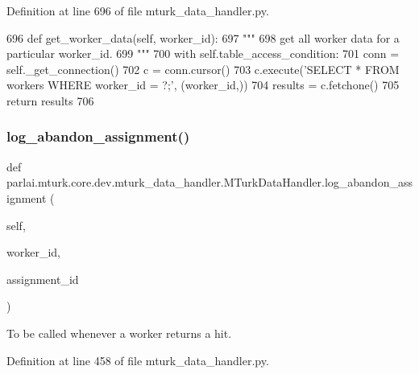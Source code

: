 Definition at line 696 of file mturk\+\_\+data\+\_\+handler.\+py.


\begin{DoxyCode}
696     \textcolor{keyword}{def }get\_worker\_data(self, worker\_id):
697         \textcolor{stringliteral}{"""}
698 \textcolor{stringliteral}{        get all worker data for a particular worker\_id.}
699 \textcolor{stringliteral}{        """}
700         with self.table\_access\_condition:
701             conn = self.\_get\_connection()
702             c = conn.cursor()
703             c.execute(\textcolor{stringliteral}{'SELECT * FROM workers WHERE worker\_id = ?;'}, (worker\_id,))
704             results = c.fetchone()
705             \textcolor{keywordflow}{return} results
706 
\end{DoxyCode}
\mbox{\label{classparlai_1_1mturk_1_1core_1_1dev_1_1mturk__data__handler_1_1MTurkDataHandler_a6f53c1208c4e3b71be96c4f3e96dab2e}} 
\subsubsection{\texorpdfstring{log\+\_\+abandon\+\_\+assignment()}{log\_abandon\_assignment()}}
{\footnotesize\ttfamily def parlai.\+mturk.\+core.\+dev.\+mturk\+\_\+data\+\_\+handler.\+M\+Turk\+Data\+Handler.\+log\+\_\+abandon\+\_\+assignment (\begin{DoxyParamCaption}\item[{}]{self,  }\item[{}]{worker\+\_\+id,  }\item[{}]{assignment\+\_\+id }\end{DoxyParamCaption})}

\begin{DoxyVerb}To be called whenever a worker returns a hit.
\end{DoxyVerb}
 

Definition at line 458 of file mturk\+\_\+data\+\_\+handler.\+py.


